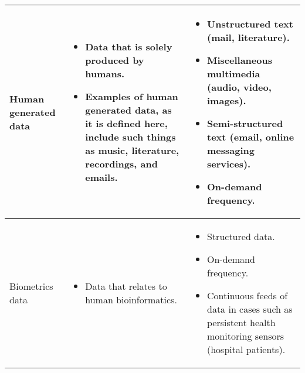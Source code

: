 \begin{landscape}
\begin{table}[H]
\begin{tabular}{ | p{4cm} | p{10cm} | p{10cm} | }
Human generated data
&
\begin{itemize}[leftmargin=*]
  \item Data that is solely produced by humans.
  \item Examples of human generated data, as it is defined here, include such things as music, literature, recordings,
  and emails.
\end{itemize}
&
\begin{itemize}[leftmargin=*]
  \item Unstructured text (mail, literature).
  \item Miscellaneous multimedia (audio, video, images).
  \item Semi-structured text (email, online messaging services).
  \item On-demand frequency.
\end{itemize}
\\ \hline

 Biometrics data
 &
 \begin{itemize}[leftmargin=*]
   \item Data that relates to human bioinformatics.
 \end{itemize}
 &
 \begin{itemize}[leftmargin=*]
   \item Structured data.
   \item On-demand frequency.
   \item Continuous feeds of data in cases such as persistent health monitoring sensors (\ie{}hospital patients).
 \end{itemize}
 \\ \hline

\end{tabular}
\end{table}
\end{landscape}